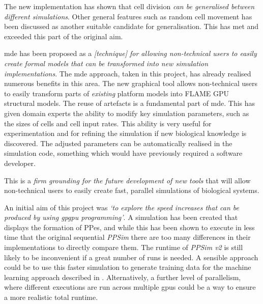 \documentclass{UoYCSproject}
\begin{document}
The new implementation has shown that cell division \textit{can be generalised between different simulations}.
Other general features such as random cell movement has been discussed as another suitable candidate for generalisation.
This has met and exceeded this part of the original aim.

\gls{mde} has been proposed as a \textit{[technique] for allowing non-technical users to easily create formal models that can be transformed into new simulation implementations}.
The \gls{mde} approach, taken in this project, has already realised numerous benefits in this area.
The new graphical tool allows non-technical users to easily transform parts of \textit{existing} platform models into \gls{FLAME GPU} structural models.
The reuse of artefacts is a fundamental part of \gls{mde}.
This has given domain experts the ability to modify key simulation parameters, such as the sizes of cells and cell input rates.
This ability is very useful for experimentation and for refining the simulation if new biological knowledge is discovered.
The adjusted parameters can be automatically realised in the simulation code, something which would have previously required a software developer.

This is a \textit{firm grounding for the future development of new tools} that will allow non-technical users to easily create fast, parallel simulations of biological systems.

An initial aim of this project was \textit{`to explore the speed increases that can be produced by using \gls{gpgpu} programming'}.
A simulation has been created that displays the formation of \gls{PP}es, and while this has been shown to execute in less time that the original sequential \textit{PPSim} there are too many differences in their implementations to directly compare them.
The runtime of \textit{PPSim v2} is still likely to be inconvenient if a great number of runs is needed.
A sensible approach could be to use this faster simulation to generate training data for the machine learning approach described in \cite{kieran_machine_learning}.
Alternatively, a further level of parallelism, where different executions are run across multiple \gls{gpu}s could be a way to ensure a more realistic total runtime.
\end{document}
